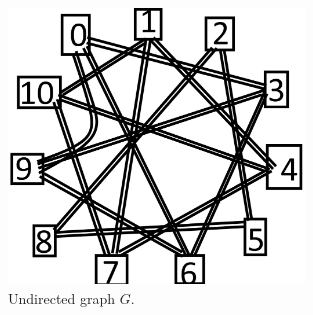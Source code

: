 \documentclass{article}
\begin{document}
\section{}
\begin{figure}[hbt!]
    \centering
    \includegraphics[width=0.7\textwidth]{graph4}
    \caption{Undirected graph $G$.}
\end{figure}
\end{document}

